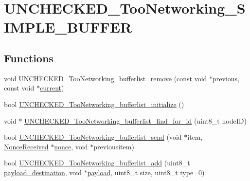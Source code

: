 \hypertarget{group__UNCHECKED__TooNetworking__SIMPLE__BUFFER}{}\section{U\+N\+C\+H\+E\+C\+K\+E\+D\+\_\+\+Too\+Networking\+\_\+\+S\+I\+M\+P\+L\+E\+\_\+\+B\+U\+F\+F\+ER}
\label{group__UNCHECKED__TooNetworking__SIMPLE__BUFFER}
\subsection*{Functions}
\begin{DoxyCompactItemize}
\item 
void \hyperlink{group__UNCHECKED__TooNetworking__SIMPLE__BUFFER_ga221880c55f667111e587482e6c8f5912}{U\+N\+C\+H\+E\+C\+K\+E\+D\+\_\+\+Too\+Networking\+\_\+bufferlist\+\_\+remove} (const void $\ast$\hyperlink{group__UNCHECKED__TooNetworking__SIMPLE__BUFFER_gaf1966d7084d2373905ae510e8f04a581}{previous}, const void $\ast$\hyperlink{group__UNCHECKED__TooNetworking__SIMPLE__BUFFER_gae8b515cceb310a575b6c2677ba93ea7e}{current})
\item 
bool \hyperlink{group__UNCHECKED__TooNetworking__SIMPLE__BUFFER_ga1ef66126726fe51d81471d24400cfe65}{U\+N\+C\+H\+E\+C\+K\+E\+D\+\_\+\+Too\+Networking\+\_\+bufferlist\+\_\+initialize} ()
\item 
void $\ast$ \hyperlink{group__UNCHECKED__TooNetworking__SIMPLE__BUFFER_ga4186735f6ab20fad96d3900e407df207}{U\+N\+C\+H\+E\+C\+K\+E\+D\+\_\+\+Too\+Networking\+\_\+bufferlist\+\_\+find\+\_\+for\+\_\+id} (uint8\+\_\+t node\+ID)
\item 
bool \hyperlink{group__UNCHECKED__TooNetworking__SIMPLE__BUFFER_ga95e0ad62a44fba61ccec4a5ecc948fce}{U\+N\+C\+H\+E\+C\+K\+E\+D\+\_\+\+Too\+Networking\+\_\+bufferlist\+\_\+send} (void $\ast$item, \hyperlink{structNonceReceived}{Nonce\+Received} $\ast$\hyperlink{group__UNCHECKED__TooNetworking__SIMPLE__BUFFER_ga8fc64ce47dc28f47b3317ae1051e4359}{nonce}, void $\ast$previousitem)
\item 
bool \hyperlink{group__UNCHECKED__TooNetworking__SIMPLE__BUFFER_gad760b4357604fa850b81b138e03ebadb}{U\+N\+C\+H\+E\+C\+K\+E\+D\+\_\+\+Too\+Networking\+\_\+bufferlist\+\_\+add} (uint8\+\_\+t \hyperlink{group__UNCHECKED__TooNetworking__SIMPLE__BUFFER_ga76db772dc25d4b2f5eb800e93ca3fd0b}{payload\+\_\+destination}, void $\ast$\hyperlink{group__UNCHECKED__TooNetworking__SIMPLE__BUFFER_ga373c8264cc39aeb3105d87e2b20dd971}{payload}, uint8\+\_\+t size, uint8\+\_\+t type=0)

\end{DoxyCompactItemize}
